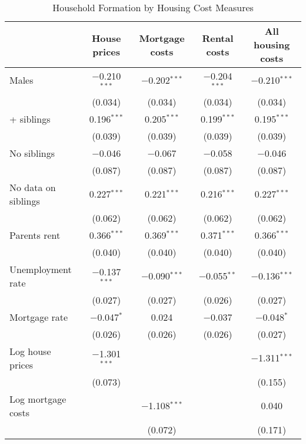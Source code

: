 \documentclass[12pt]{article}
\begin{document}
\begin{table}[htpb] \centering
  \begin{threeparttable}
  \caption{Household Formation by Housing Cost Measures}
  \label{Res2}
  \tabularnewline
  \begin{tabular}{@{\extracolsep{1pt}}lcccc}
    \toprule
     & House prices & Mortgage costs & Rental costs & All housing costs \\
    \midrule
    Males & $-$0.210$^{***}$ & $-$0.202$^{***}$ & $-$0.204$^{***}$ & $-$0.210$^{***}$ \\
     & (0.034) & (0.034) & (0.034) & (0.034) \\
\addlinespace[0.5em]
    2+ siblings & 0.196$^{***}$ & 0.205$^{***}$ & 0.199$^{***}$ & 0.195$^{***}$ \\
     & (0.039) & (0.039) & (0.039) & (0.039) \\
\addlinespace[0.5em]
    No siblings & $-$0.046 & $-$0.067 & $-$0.058 & $-$0.046 \\
     & (0.087) & (0.087) & (0.087) & (0.087) \\
\addlinespace[0.5em]
    No data on siblings & 0.227$^{***}$ & 0.221$^{***}$ & 0.216$^{***}$ & 0.227$^{***}$ \\
     & (0.062) & (0.062) & (0.062) & (0.062) \\
\addlinespace[0.5em]
    Parents rent & 0.366$^{***}$ & 0.369$^{***}$ & 0.371$^{***}$ & 0.366$^{***}$ \\
     & (0.040) & (0.040) & (0.040) & (0.040) \\
\addlinespace[0.5em]
    Unemployment rate & $-$0.137$^{***}$ & $-$0.090$^{***}$ & $-$0.055$^{**}$ & $-$0.136$^{***}$ \\
     & (0.027) & (0.027) & (0.026) & (0.027) \\
\addlinespace[0.5em]
    Mortgage rate & $-$0.047$^{*}$ & 0.024 & $-$0.037 & $-$0.048$^{*}$ \\
     & (0.026) & (0.026) & (0.026) & (0.027) \\
\addlinespace[0.5em]
    Log house prices & $-$1.301$^{***}$ &  &  & $-$1.311$^{***}$ \\
     & (0.073) &  &  & (0.155) \\
\addlinespace[0.5em]
    Log mortgage costs &  & $-$1.108$^{***}$ &  & 0.040 \\
     &  & (0.072) &  & (0.171) \\

\end{tabular}
\end{threeparttable}
\end{table}
\end{document}
